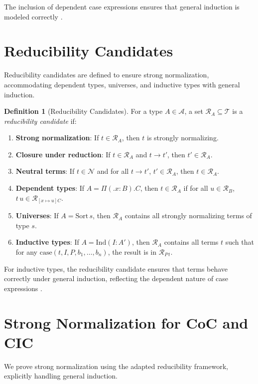 \documentclass{article}
\theoremstyle{plain}
\theoremstyle{definition}
\newtheorem{definition}{Definition}[section]
\newcommand{\term}{\mathcal{T}}
\newcommand{\type}{\mathcal{A}}
\newcommand{\reduct}{\mathcal{R}}
\newcommand{\neut}{\mathcal{N}}
\newcommand{\fib}[2]{\Pi #1 . #2}
\newcommand{\app}[2]{#1 \, #2}
\newcommand{\subst}[3]{[#1 \mapsto #2] #3}
\newcommand{\rewrite}{\to}
\newcommand{\ind}{\text{Ind}}
\newcommand{\case}{\text{case}}
\begin{document}
The inclusion of dependent case expressions ensures that general induction
is modeled correctly \cite{werner1994}.

\newpage
\section{Reducibility Candidates}

Reducibility candidates are defined to ensure strong normalization,
accommodating dependent types, universes, and inductive types with general induction.

\begin{definition}[Reducibility Candidates]
For a type \(A \in \type\), a set \(\reduct_A \subseteq \term\) is a \emph{reducibility candidate} if:
\begin{enumerate}
  \item \textbf{Strong normalization}: If \(t \in \reduct_A\), then \(t\) is strongly normalizing.
  \item \textbf{Closure under reduction}: If \(t \in \reduct_A\) and \(t \rewrite t'\), then \(t' \in \reduct_A\).
  \item \textbf{Neutral terms}: If \(t \in \neut\) and for all \(t \rewrite t'\), \(t' \in \reduct_A\), then \(t \in \reduct_A\).
  \item \textbf{Dependent types}: If \(A = \fib (x : B). C\), then \(t \in \reduct_A\) if for all \(u \in \reduct_B\), \(\app{t}{u} \in \reduct_{\subst{x}{u}{C}}\).
  \item \textbf{Universes}: If \(A = \text{Sort} \, s\), then \(\reduct_A\) contains all strongly normalizing terms of type \(s\).
  \item \textbf{Inductive types}: If \(A = \ind(I : A')\), then \(\reduct_A\) contains all terms \(t\) such that for any \(\case(t, I, P, b_1, \dots, b_n)\), the result is in \(\reduct_{\app{P}{t}}\).
\end{enumerate}
\end{definition}

For inductive types, the reducibility candidate ensures that terms
behave correctly under general induction, reflecting the dependent
nature of case expressions \cite{werner1994}.

\newpage

\section{Strong Normalization for CoC and CIC}

We prove strong normalization using the adapted reducibility framework,
explicitly handling general induction.
\end{document}
